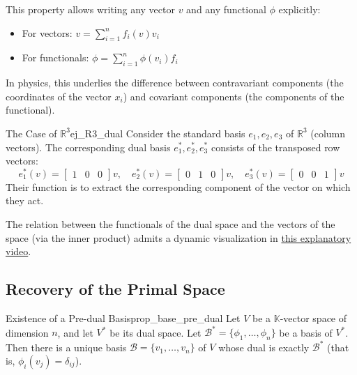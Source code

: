 \documentclass[11pt, a4paper]{article}
\begin{document}
This property allows writing any vector $v$ and any functional $\phi$ explicitly:

\begin{itemize}
    \item For vectors: $v = \sum_{i=1}^n f_i(v) v_i$
    \item For functionals: $\phi = \sum_{i=1}^n \phi(v_i) f_i$
\end{itemize}

\obs
In physics, this underlies the difference between contravariant components (the coordinates of the vector $x_i$) and covariant components (the components of the functional).

\begin{ejemplo}{The Case of $\mathbb{R}^3$}{ej_R3_dual}
Consider the standard basis $e_1, e_2, e_3$ of $\mathbb{R}^3$ (column vectors). The corresponding dual basis $e^*_1, e^*_2, e^*_3$ consists of the transposed row vectors:
\[
e^*_1(v) = \begin{bmatrix} 1 & 0 & 0 \end{bmatrix} v, \quad 
e^*_2(v) = \begin{bmatrix} 0 & 1 & 0 \end{bmatrix} v, \quad 
e^*_3(v) = \begin{bmatrix} 0 & 0 & 1 \end{bmatrix} v
\]
Their function is to extract the corresponding component of the vector on which they act.
\end{ejemplo}

The relation between the functionals of the dual space and the vectors of the space (via the inner product) admits a dynamic visualization in \href{https://www.youtube.com/watch?v=LyGKycYT2v0}{this explanatory video}.

\subsection{Recovery of the Primal Space}

\begin{proposicion}{Existence of a Pre-dual Basis}{prop_base_pre_dual}
Let $V$ be a $\mathbb{K}$-vector space of dimension $n$, and let $V^*$ be its dual space. 
Let $\mathcal{B}^* = \{\phi_1, \dots, \phi_n\}$ be a basis of $V^*$. 
Then there is a unique basis $\mathcal{B} = \{v_1, \dots, v_n\}$ of $V$ whose dual is exactly $\mathcal{B}^*$ (that is, $\phi_i(v_j) = \delta_{ij}$).
\end{proposicion}
\end{document}
